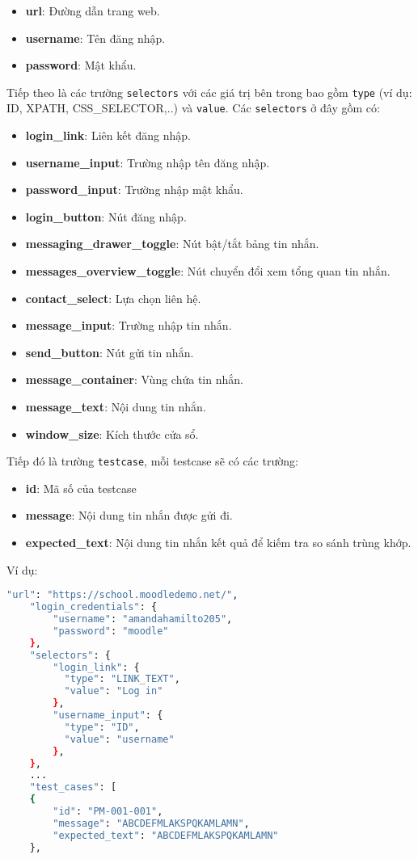\begin{itemize}
    \item \textbf{url}: Đường dẫn trang web.
    \item \textbf{username}: Tên đăng nhập.
    \item \textbf{password}: Mật khẩu.
\end{itemize}
Tiếp theo là các trường \texttt{selectors} với các giá trị bên trong bao gồm \texttt{type} (ví dụ: ID, XPATH, CSS\_SELECTOR,..) và \texttt{value}. Các \texttt{selectors} ở đây gồm có:
\begin{itemize}
    \item \textbf{login\_link}: Liên kết đăng nhập.
    \item \textbf{username\_input}: Trường nhập tên đăng nhập.
    \item \textbf{password\_input}: Trường nhập mật khẩu.
    \item \textbf{login\_button}: Nút đăng nhập.
    \item \textbf{messaging\_drawer\_toggle}: Nút bật/tắt bảng tin nhắn.
    \item \textbf{messages\_overview\_toggle}: Nút chuyển đổi xem tổng quan tin nhắn.
    \item \textbf{contact\_select}: Lựa chọn liên hệ.
    \item \textbf{message\_input}: Trường nhập tin nhắn.
    \item \textbf{send\_button}: Nút gửi tin nhắn.
    \item \textbf{message\_container}: Vùng chứa tin nhắn.
    \item \textbf{message\_text}: Nội dung tin nhắn.
    \item \textbf{window\_size}: Kích thước cửa sổ.
\end{itemize}

\noindent Tiếp đó là trường \texttt{testcase}, mỗi testcase sẽ có các trường:
\begin{itemize}
    \item \textbf{id}: Mã số của testcase
    \item \textbf{message}: Nội dung tin nhắn được gửi đi.
    \item \textbf{expected\_text}: Nội dung tin nhắn kết quả để kiếm tra so sánh trùng khớp.
\end{itemize}

\noindent Ví dụ:
\begin{lstlisting}[language=bash, breaklines=true]
    "url": "https://school.moodledemo.net/",
    "login_credentials": {
        "username": "amandahamilto205",
        "password": "moodle"
    },
    "selectors": {
        "login_link": {
          "type": "LINK_TEXT",
          "value": "Log in"
        },
        "username_input": {
          "type": "ID",
          "value": "username"
        },
    },
    ...
    "test_cases": [
    {
        "id": "PM-001-001",
        "message": "ABCDEFMLAKSPQKAMLAMN",
        "expected_text": "ABCDEFMLAKSPQKAMLAMN"
    },
\end{lstlisting}


